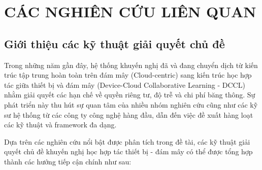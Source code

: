 \chapter{CÁC NGHIÊN CỨU LIÊN QUAN}

\section{Giới thiệu các kỹ thuật giải quyết chủ đề}

Trong những năm gần đây, hệ thống khuyến nghị đã và đang chuyển dịch từ kiến trúc tập trung hoàn toàn trên đám mây (Cloud-centric) sang kiến trúc học hợp tác giữa thiết bị và đám mây (Device-Cloud Collaborative Learning - DCCL) nhằm giải quyết các hạn chế về quyền riêng tư, độ trễ và chi phí băng thông. Sự phát triển này thu hút sự quan tâm của nhiều nhóm nghiên cứu cũng như các kỹ sư hệ thống từ các công ty công nghệ hàng đầu, dẫn đến việc đề xuất hàng loạt các kỹ thuật và framework đa dạng. 

Dựa trên các nghiên cứu nổi bật được phân tích trong đề tài, các kỹ thuật giải quyết chủ đề khuyến nghị học hợp tác thiết bị - đám mây có thể được tổng hợp thành các hướng tiếp cận chính như sau:

